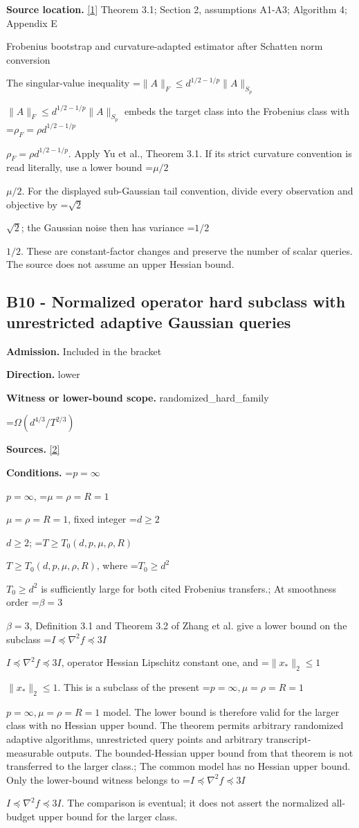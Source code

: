 \documentclass[10pt,a4paper]{article}
\newcommand{\AtlasMath}[1]{\par\begingroup\centering\setbox0=\hbox{$\displaystyle #1$}\ifdim\wd0>1.4\linewidth\typeout{ATLAS WIDE FORMULA: \the\wd0}\fi\ifdim\wd0>\linewidth\resizebox{\linewidth}{!}{\box0}\else\box0\fi\par\endgroup}
\newcommand{\AtlasInlineMath}[1]{\begingroup\setbox0=\hbox{$#1$}\ifdim\wd0>.4\linewidth\endgroup\AtlasMath{#1}\else\endgroup$#1$\fi}
\begin{document}
\textbf{Source location.} \href{https://papers.nips.cc/paper_files/paper/2024/file/b444ad72520a5f5c467343be88e352ed-Paper-Conference.pdf}{[1]} Theorem 3.1; Section 2, assumptions A1-A3; Algorithm 4; Appendix E



Frobenius bootstrap and curvature-adapted estimator after Schatten norm conversion



The singular-value inequality \AtlasInlineMath{\|A\|_F\le d^{1/2-1/p}\|A\|_{S_p}} embeds the target class into the Frobenius class with \AtlasInlineMath{\rho_F=\rho d^{1/2-1/p}}. Apply Yu et al., Theorem 3.1. If its strict curvature convention is read literally, use a lower bound \AtlasInlineMath{\mu/2}. For the displayed sub-Gaussian tail convention, divide every observation and objective by \AtlasInlineMath{\sqrt2}; the Gaussian noise then has variance \AtlasInlineMath{1/2}. These are constant-factor changes and preserve the number of scalar queries. The source does not assume an upper Hessian bound.



\subsection{B10 - Normalized operator hard subclass with unrestricted adaptive Gaussian queries}


\textbf{Admission.} Included in the bracket



\textbf{Direction.} lower



\textbf{Witness or lower-bound scope.} randomized\_hard\_family



\AtlasMath{\Omega(d^{4/3}/T^{2/3})}


\textbf{Sources.} \href{https://arxiv.org/html/2610.00276v2}{[2]}



\textbf{Conditions.} \AtlasInlineMath{p=\infty}, \AtlasInlineMath{\mu=\rho=R=1}, fixed integer \AtlasInlineMath{d\ge2}; \AtlasInlineMath{T\ge T_0(d,p,\mu,\rho,R)}, where \AtlasInlineMath{T_0\ge d^2} is sufficiently large for both cited Frobenius transfers.; At smoothness order \AtlasInlineMath{\beta=3}, Definition 3.1 and Theorem 3.2 of Zhang et al. give a lower bound on the subclass \AtlasInlineMath{I\preceq\nabla^2 f\preceq3I}, operator Hessian Lipschitz constant one, and \AtlasInlineMath{\|x_*\|_2\le1}. This is a subclass of the present \AtlasInlineMath{p=\infty,\mu=\rho=R=1} model. The lower bound is therefore valid for the larger class with no Hessian upper bound. The theorem permits arbitrary randomized adaptive algorithms, unrestricted query points and arbitrary transcript-measurable outputs. The bounded-Hessian upper bound from that theorem is not transferred to the larger class.; The common model has no Hessian upper bound. Only the lower-bound witness belongs to \AtlasInlineMath{I\preceq\nabla^2 f\preceq3I}. The comparison is eventual; it does not assert the normalized all-budget upper bound for the larger class.
\end{document}

